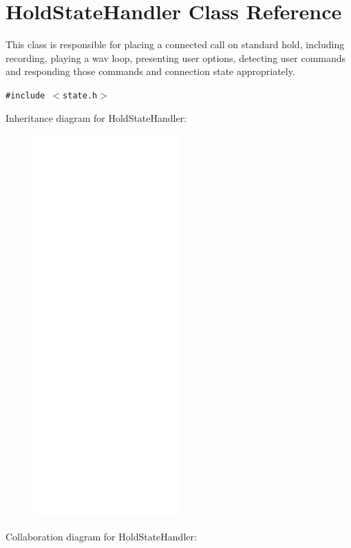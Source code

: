 \hypertarget{classHoldStateHandler}{
\section{HoldStateHandler Class Reference}
\label{classHoldStateHandler}
}
This class is responsible for placing a connected call on standard hold, including recording, playing a wav loop, presenting user options, detecting user commands and responding those commands and connection state appropriately.  


{\tt \#include $<$state.h$>$}

Inheritance diagram for HoldStateHandler:\nopagebreak
\begin{figure}[H]
\begin{center}
\leavevmode
\includegraphics[width=160pt]{classHoldStateHandler__inherit__graph}
\end{center}
\end{figure}
Collaboration diagram for HoldStateHandler:\nopagebreak
